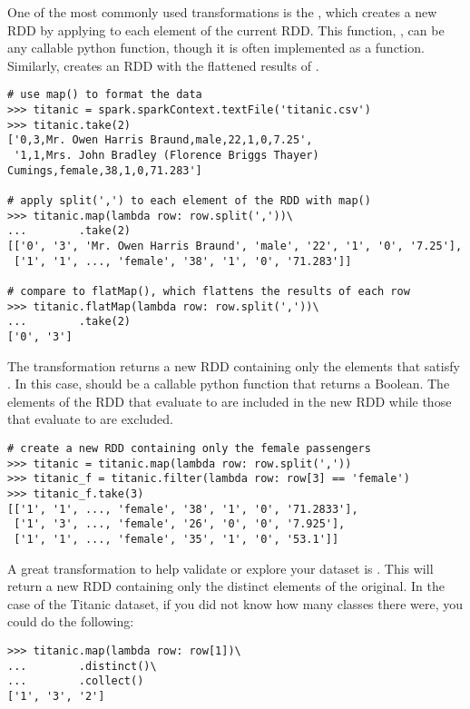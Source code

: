 One of the most commonly used transformations is the , which creates a new RDD by applying  to each element of the current RDD. This function, , can be any callable python function, though it is often implemented as a  function.
Similarly,  creates an RDD with the flattened results of .

\begin{lstlisting}
# use map() to format the data
>>> titanic = spark.sparkContext.textFile('titanic.csv')
>>> titanic.take(2)
['0,3,Mr. Owen Harris Braund,male,22,1,0,7.25',
 '1,1,Mrs. John Bradley (Florence Briggs Thayer) Cumings,female,38,1,0,71.283']

# apply split(',') to each element of the RDD with map()
>>> titanic.map(lambda row: row.split(','))\
...		   .take(2)
[['0', '3', 'Mr. Owen Harris Braund', 'male', '22', '1', '0', '7.25'],
 ['1', '1', ..., 'female', '38', '1', '0', '71.283']]

# compare to flatMap(), which flattens the results of each row
>>> titanic.flatMap(lambda row: row.split(','))\
...		   .take(2)
['0', '3']
\end{lstlisting}

The  transformation returns a new RDD containing only the elements that satisfy . In this case,  should be a callable python function that returns a Boolean. 
The elements of the RDD that evaluate to  are included in the new RDD while those that evaluate to  are excluded.


\begin{lstlisting}
# create a new RDD containing only the female passengers
>>> titanic = titanic.map(lambda row: row.split(','))
>>> titanic_f = titanic.filter(lambda row: row[3] == 'female')
>>> titanic_f.take(3)
[['1', '1', ..., 'female', '38', '1', '0', '71.2833'],
 ['1', '3', ..., 'female', '26', '0', '0', '7.925'],
 ['1', '1', ..., 'female', '35', '1', '0', '53.1']]
\end{lstlisting}

\begin{info}
A great transformation to help validate or explore your dataset is . This will return a new RDD containing only the distinct elements of the original. In the case of the Titanic dataset, if you did not know how many classes there were, you could do the following:
\begin{lstlisting}
>>> titanic.map(lambda row: row[1])\
...		   .distinct()\
...		   .collect()
['1', '3', '2']
\end{lstlisting}
\end{info}


